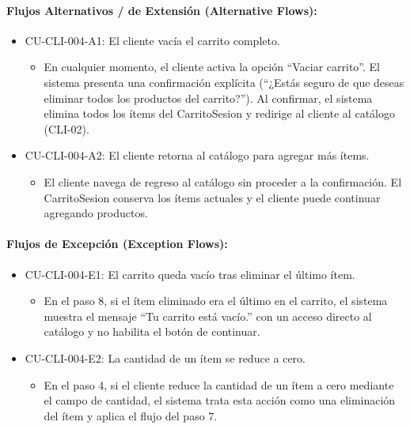 \paragraph{Flujos Alternativos / de Extensión (Alternative Flows):}
\begin{itemize}
    \item CU-CLI-004-A1: El cliente vacía el carrito completo.
    \begin{itemize}
        \item En cualquier momento, el cliente activa la opción ``Vaciar carrito''. El sistema presenta una confirmación explícita (``¿Estás seguro de que deseas eliminar todos los productos del carrito?''). Al confirmar, el sistema elimina todos los ítems del CarritoSesion y redirige al cliente al catálogo (CLI-02).
    \end{itemize}
    \item CU-CLI-004-A2: El cliente retorna al catálogo para agregar más ítems.
    \begin{itemize}
        \item El cliente navega de regreso al catálogo sin proceder a la confirmación. El CarritoSesion conserva los ítems actuales y el cliente puede continuar agregando productos.
    \end{itemize}
\end{itemize}

\paragraph{Flujos de Excepción (Exception Flows):}
\begin{itemize}
    \item CU-CLI-004-E1: El carrito queda vacío tras eliminar el último ítem.
    \begin{itemize}
        \item En el paso 8, si el ítem eliminado era el último en el carrito, el sistema muestra el mensaje ``Tu carrito está vacío.'' con un acceso directo al catálogo y no habilita el botón de continuar.
    \end{itemize}
    \item CU-CLI-004-E2: La cantidad de un ítem se reduce a cero.
    \begin{itemize}
        \item En el paso 4, si el cliente reduce la cantidad de un ítem a cero mediante el campo de cantidad, el sistema trata esta acción como una eliminación del ítem y aplica el flujo del paso 7.
    \end{itemize}
\end{itemize}

